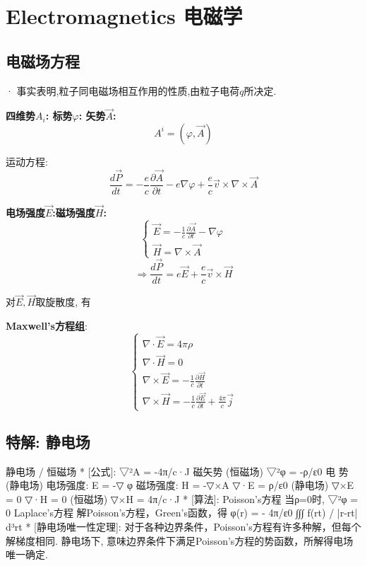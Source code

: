 \documentclass{article}
\begin{document}
\section{Electromagnetics 电磁学}
    \subsection{电磁场方程}
        · 事实表明,粒子同电磁场相互作用的性质,由粒子电荷$q$所决定.
    
        \textbf{四维势$A_{i}$: \quad 标势$\varphi$: \quad 矢势$\vec A$:}
            $$A^{i}=(\varphi,\vec A)$$
            
        运动方程:
            $$\frac{d\vec P}{dt} = - \frac{e}{c} \frac{\partial\vec A}{\partial t} - e \nabla \varphi + \frac{e}{c} \vec v \times \nabla \times \vec A$$
            
        \textbf{电场强度$\vec E$:\quad 磁场强度$\vec H$:}
            \begin{displaymath}
                \left\{ \begin{array}{ll}
                \vec E = -\frac{1}{c} \frac{\partial \vec A}{\partial t} - \nabla \varphi\\
                \vec H = \nabla \times \vec A
                \end{array} \right.
            \end{displaymath}
            $$\Rightarrow \frac{d\vec P}{dt} = e \vec E + \frac{e}{c} \vec v \times \vec H$$
            
        对$\vec E,\vec H$取旋散度, 有
        
        \textbf{Maxwell's方程组}:
            \begin{displaymath}
                \left\{ \begin{array}{ll}
                \nabla \cdot \vec E = 4\pi\rho\\
                \nabla \cdot \vec H = 0\\
                \nabla \times \vec E = - \frac{1}{c} \frac{\partial \vec H}{\partial t}\\
                \nabla \times \vec H = - \frac{1}{c} \frac{\partial \vec E}{\partial t} + \frac{4\pi}{c}\vec j
                \end{array} \right.
            \end{displaymath}


\subsection{特解: 静电场}
静电场  /  恒磁场
*	[公式]: 
		▽²A  = -4π/c·J		磁矢势 (恒磁场)
		▽²φ = -ρ/ε0			电  势 (静电场)
		电场强度: E = -▽ φ
		磁场强度: H = -▽×A
		▽·E = ρ/ε0			(静电场)
		▽×E = 0
		▽·H = 0				(恒磁场)
		▽×H = 4π/c·J
*	[算法]:	Poisson's方程		
		当ρ=0时, ▽²φ = 0		Laplace's方程
		解Poisson's方程，Green's函数，得 φ(r) = - 4π/ε0 ∫∫∫ f(rt) / |r-rt| d³rt
*	[静电场唯一性定理]:
		对于各种边界条件，Poisson's方程有许多种解，但每个解梯度相同.
		静电场下, 意味边界条件下满足Poisson's方程的势函数，所解得电场唯一确定.
\end{document}
